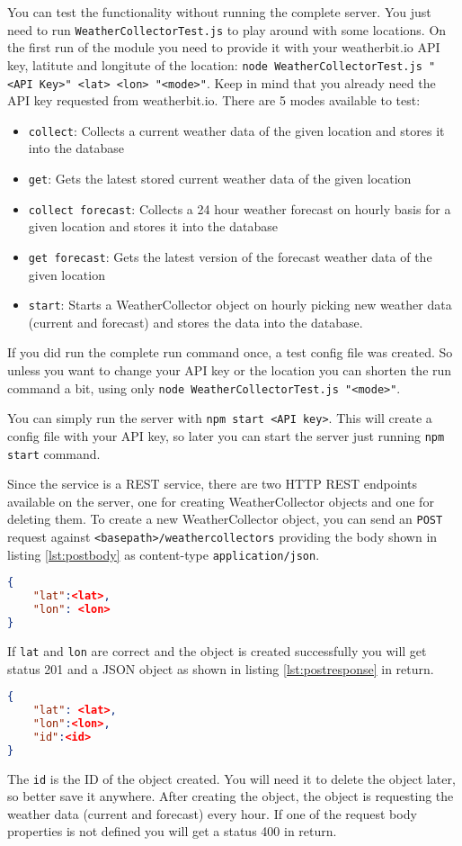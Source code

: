 You can test the functionality without running the complete server.
You just need to run \texttt{WeatherCollectorTest.js} to play around with some locations. 
On the first run of the module you need to provide it with your weatherbit.io API key, latitute and longitute of the location: \texttt{node WeatherCollectorTest.js "<API Key>" <lat> <lon> "<mode>"}. 
Keep in mind that you already need the API key requested from weatherbit.io.
There are 5 modes available to test:
\begin{itemize}
	\item \texttt{collect}: Collects a current weather data of the given location and stores it into the database
	\item \texttt{get}: Gets the latest stored current weather data of the given location
	\item \texttt{collect forecast}: Collects a 24 hour weather forecast on hourly basis for a given location and stores it into the database
	\item \texttt{get forecast}: Gets the latest version of the forecast weather data of the given location
	\item \texttt{start}: Starts a WeatherCollector object on hourly picking new weather data (current and forecast) and stores the data into the database.
\end{itemize}

If you did run the complete run command once, a test config file was created. 
So unless you want to change your API key or the location you can shorten the run command a bit, using only \texttt{node WeatherCollectorTest.js "<mode>"}.

You can simply run the server with \texttt{npm start <API key>}. 
This will create a config file with your API key, so later you can start the server just running \texttt{npm start} command.

Since the service is a REST service, there are two HTTP REST endpoints available on the server, one for creating WeatherCollector objects and one for deleting them.
To create a new WeatherCollector object, you can send an \texttt{POST} request against \texttt{<basepath>/weathercollectors} providing the body shown in listing \ref{lst:postbody} as content-type \texttt{application/json}. 
\begin{lstlisting}[caption={Body of \texttt{POST} request endpoint}, label={lst:postbody}, frame=single, language=json]
{ 
	"lat":<lat>, 
	"lon": <lon> 
}
\end{lstlisting} 
If \texttt{lat} and \texttt{lon} are correct and the object is created successfully you will get status 201 and a JSON object as shown in listing \ref{lst:postresponse} in return.
\begin{lstlisting}[caption={Body of the response of the \texttt{POST} request}, label={lst:postresponse}, frame=single, language=json]
{ 
	"lat": <lat>, 
	"lon":<lon>, 
	"id":<id> 
}
\end{lstlisting}
The \texttt{id} is the ID of the object created. 
You will need it to delete the object later, so better save it anywhere. 
After creating the object, the object is requesting the weather data (current and forecast) every hour. 
If one of the request body properties is not defined you will get a status 400 in return.

